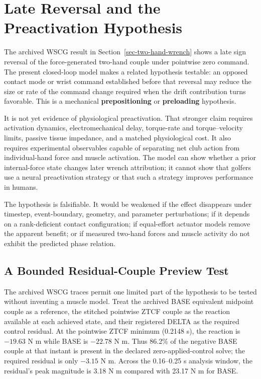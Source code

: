 \documentclass[
  letterpaper,
]{report}
\begin{document}
\section{Late Reversal and the Preactivation
Hypothesis}\label{sec-preactivation-hypothesis}

The archived WSCG result in Section~\ref{sec-two-hand-wrench} shows a
late sign reversal of the force-generated two-hand couple under
pointwise zero command. The present closed-loop model makes a related
hypothesis testable: an opposed contact mode or wrist command
established before that reversal may reduce the size or rate of the
command change required when the drift contribution turns favorable.
This is a mechanical \textbf{prepositioning} or \textbf{preloading}
hypothesis.

It is not yet evidence of physiological preactivation. That stronger
claim requires activation dynamics, electromechanical delay, torque-rate
and torque--velocity limits, passive tissue impedance, and a matched
physiological cost. It also requires experimental observables capable of
separating net club action from individual-hand force and muscle
activation. The model can show whether a prior internal-force state
changes later wrench attribution; it cannot show that golfers use a
neural preactivation strategy or that such a strategy improves
performance in humans.

The hypothesis is falsifiable. It would be weakened if the effect
disappears under timestep, event-boundary, geometry, and parameter
perturbations; if it depends on a rank-deficient contact configuration;
if equal-effort actuator models remove the apparent benefit; or if
measured two-hand forces and muscle activity do not exhibit the
predicted phase relation.

\subsection{A Bounded Residual-Couple Preview
Test}\label{sec-preactivation-preview-test}

The archived WSCG traces permit one limited part of the hypothesis to be
tested without inventing a muscle model. Treat the archived BASE
equivalent midpoint couple as a reference, the stitched pointwise ZTCF
couple as the reaction available at each achieved state, and their
registered DELTA as the required control residual. At the pointwise ZTCF
minimum (0.2148 s), the reaction is \(-19.63\) N m while BASE is
\(-22.78\) N m. Thus 86.2\% of the negative BASE couple at that instant
is present in the declared zero-applied-control solve; the required
residual is only \(-3.15\) N m. Across the 0.16--0.25 s analysis window,
the residual's peak magnitude is 3.18 N m compared with 23.17 N m for
BASE.
\end{document}
